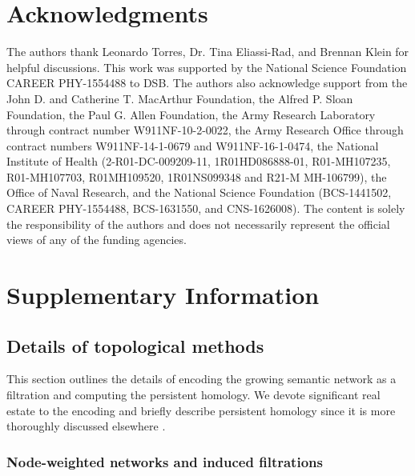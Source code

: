 \documentclass{article}
\begin{document}
\section*{Acknowledgments}
The authors thank Leonardo Torres, Dr. Tina Eliassi-Rad, and Brennan Klein for helpful discussions. This work was supported by the National Science Foundation CAREER PHY-1554488 to DSB. The authors also acknowledge support from the John D. and Catherine T. MacArthur Foundation, the Alfred P. Sloan Foundation, the Paul G. Allen Foundation, the Army Research Laboratory through contract number W911NF-10-2-0022, the Army Research Office through contract numbers W911NF-14-1-0679 and W911NF-16-1-0474, the National Institute of Health (2-R01-DC-009209-11, 1R01HD086888-01, R01-MH107235, R01-MH107703, R01MH109520, 1R01NS099348 and R21-M MH-106799), the Office of Naval Research, and the National Science Foundation (BCS-1441502, CAREER PHY-1554488, BCS-1631550, and CNS-1626008). The content is solely the responsibility of the authors and does not necessarily represent the official views of any of the funding agencies.






\clearpage
\newpage

\onecolumn
\renewcommand{\thefigure}{S\arabic{figure}}

\setcounter{figure}{0}

\section*{Supplementary Information}


\subsection*{Details of topological methods}

This section outlines the details of encoding the growing semantic network as a filtration and computing the persistent homology. We devote significant real estate to the encoding and briefly describe persistent homology since it is more thoroughly discussed elsewhere \cite{carlsson2009topology,zomorodian2005computing,ghrist2008barcodes,hatcher2002algebraic}.

\subsubsection*{Node-weighted networks and induced filtrations}
\end{document}
